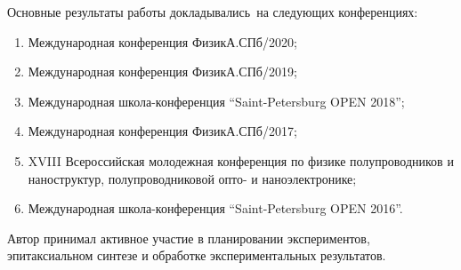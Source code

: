 {\probation}
Основные результаты работы докладывались~на следующих конференциях:
\begin{enumerate}[beginpenalty=10000]
  \item Международная конференция ФизикА.СПб/2020;
  \item Международная конференция ФизикА.СПб/2019;
  \item Международная школа-конференция “Saint-Petersburg OPEN 2018”;
  \item Международная конференция ФизикА.СПб/2017;
  \item XVIII Всероссийская молодежная конференция по физике полупроводников и наноструктур, полупроводниковой опто- и наноэлектронике;
  \item Международная школа-конференция “Saint-Petersburg OPEN 2016”.
\end{enumerate}

{\contribution} Автор принимал активное участие в планировании экспериментов, эпитаксиальном синтезе и обработке экспериментальных результатов.

